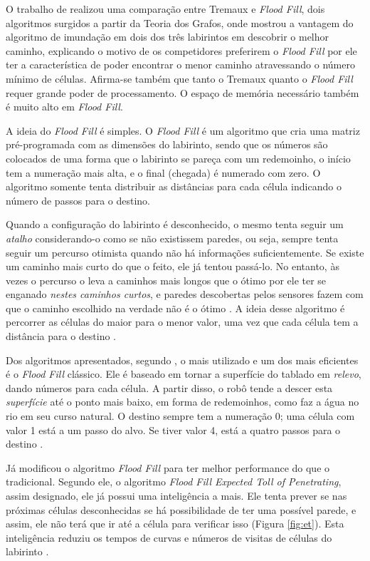 O trabalho de  realizou uma comparação entre Tremaux e \emph{Flood Fill}, dois algoritmos surgidos a partir da Teoria dos Grafos, onde mostrou a vantagem do algoritmo de imundação em dois dos três labirintos em descobrir o melhor caminho, explicando o motivo de os competidores preferirem o \emph{Flood Fill} por ele ter a característica de poder encontrar o menor caminho atravessando o número mínimo de células. Afirma-se também que tanto o Tremaux quanto o \emph{Flood Fill} requer grande poder de processamento. O espaço de memória necessário também é muito alto em \emph{Flood Fill}.


A ideia do \emph{Flood Fill} é simples. O \emph{Flood Fill} é um algoritmo que cria uma matriz pré-programada com as dimensões do labirinto, sendo que os números são colocados de uma forma que o labirinto se pareça com um redemoinho, o início tem a numeração mais alta, e o final (chegada) é numerado com zero. O algoritmo somente tenta distribuir as distâncias para cada célula indicando o número de passos para o destino. 

Quando a configuração do labirinto é desconhecido, o mesmo tenta seguir um \emph{atalho} considerando-o como se não existissem paredes, ou seja, sempre tenta seguir um percurso otimista quando não há informações suficientemente. Se existe um caminho mais curto do que o feito, ele já tentou passá-lo. No entanto, às vezes o percurso o leva a caminhos mais longos que o ótimo por ele ter se enganado \emph{nestes caminhos curtos}, e paredes descobertas pelos sensores fazem com que o caminho escolhido na verdade não é o ótimo \cite{5578409}. A ideia desse algoritmo é percorrer as células do maior para o menor valor, uma vez que cada célula tem a distância para o destino \cite{remendo3}.

Dos algoritmos apresentados, segundo , o mais utilizado e um dos mais eficientes é o \textit{Flood Fill} clássico. Ele é baseado em tornar a superfície do tablado em \emph{relevo}, dando números para cada célula. A partir disso, o robô tende a descer esta \emph{superfície} até o ponto mais baixo, em forma de redemoinhos, como faz a água no rio em seu curso natural. O destino sempre tem a numeração 0; uma célula com valor 1 está a um passo do alvo. Se tiver valor 4, está a quatro passos para o destino \cite{utad}.

Já  modificou o algoritmo \emph{Flood Fill} para ter melhor performance do que o tradicional. Segundo ele, o algoritmo \emph{Flood Fill Expected Toll of Penetrating}, assim designado, ele já possui uma inteligência a mais. Ele tenta prever se nas próximas células desconhecidas se há possibilidade de ter uma possível parede, e assim, ele não terá que ir até a célula para verificar isso (Figura \ref{fig:et}). Esta inteligência reduziu os tempos de curvas e números de visitas de células do labirinto \cite{6332345}. 

